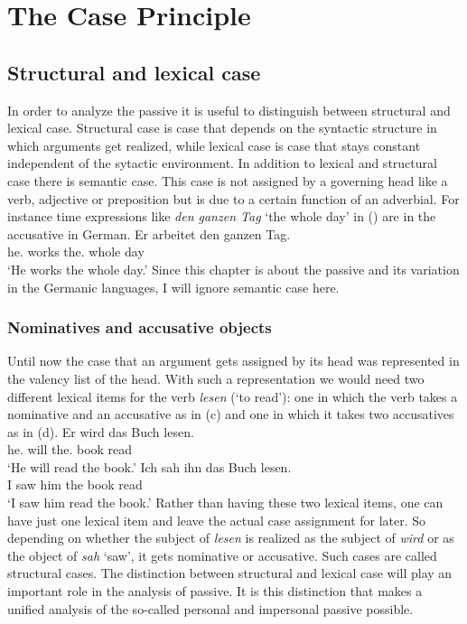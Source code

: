 \section{The Case Principle}


\subsection{Structural and lexical case}
\label{sec-struk-lex-kas}
\label{sec-struc-lex-kas}

In order to analyze the passive it is useful to distinguish between structural and lexical
case. Structural case is case that depends on the syntactic structure in which arguments get
realized, while lexical case is case that stays constant independent of the sytactic environment. In
addition to lexical and structural case there is semantic case. This case is not assigned by a
governing head like a verb, adjective or preposition but is due to a certain function of an
adverbial. For instance time expressions like \emph{den ganzen Tag} `the whole day' in () are
in the accusative in German.
\ea
\gll Er arbeitet den ganzen Tag.\\
     he.\NOM{} works the.\ACC{} whole day\\
\glt `He works the whole day.'
\z
Since this chapter is about the passive and its variation in the Germanic languages, I will ignore
semantic case here.

\subsubsection{Nominatives and accusative objects}

Until now the case that an argument gets assigned by its head was represented in the valency list of
the head. With such a representation we would need two different lexical items for the verb
\emph{lesen} (`to read'): one in which the verb takes a nominative and an accusative as in
(c) and one in which it takes two accusatives as in (d).
\eal
\ex 
\gll Er wird das Buch lesen.\\
     he.\NOM{} will  the.\ACC{} book read\\\german
\glt `He will read the book.'
\ex 
\gll Ich sah ihn das Buch lesen.\\
     I   saw him the book read\\
\glt `I saw him read the book.'
\ex {}
\ex {}
\zl
Rather than having these two lexical items, one can have just one lexical item and leave the actual
case assignment for later. So depending on whether the subject of \emph{lesen} is realized as the
subject of \emph{wird} or as the object of \emph{sah} `saw', it gets nominative or accusative. Such
cases are called structural cases. The distinction between structural and lexical case will play an
important role in the analysis of passive. It is this distinction that makes a unified analysis of
the so-called personal and impersonal passive possible.

